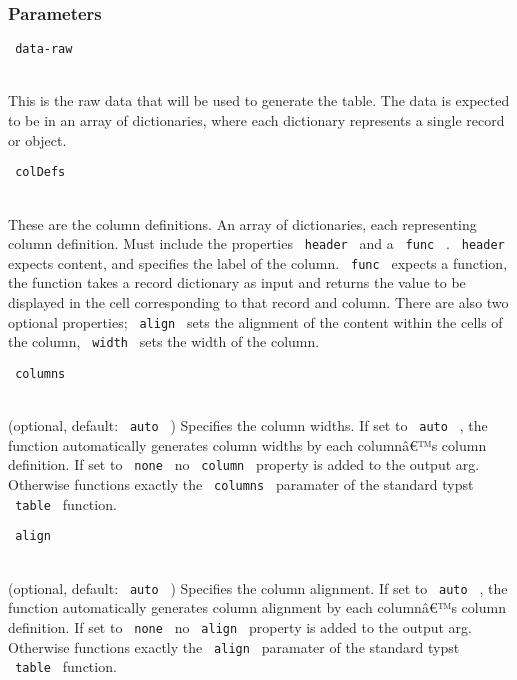 \begin{Shaded}
\begin{Highlighting}[]
\end{Highlighting}
\end{Shaded}

\subsubsection{Parameters}\label{parameters-1}

\texttt{\ data-raw\ }\strut \\
This is the raw data that will be used to generate the table. The data
is expected to be in an array of dictionaries, where each dictionary
represents a single record or object.

\texttt{\ colDefs\ }\strut \\
These are the column definitions. An array of dictionaries, each
representing column definition. Must include the properties
\texttt{\ header\ } and a \texttt{\ func\ } . \texttt{\ header\ }
expects content, and specifies the label of the column.
\texttt{\ func\ } expects a function, the function takes a record
dictionary as input and returns the value to be displayed in the cell
corresponding to that record and column. There are also two optional
properties; \texttt{\ align\ } sets the alignment of the content within
the cells of the column, \texttt{\ width\ } sets the width of the
column.

\texttt{\ columns\ }\strut \\
(optional, default: \texttt{\ auto\ } ) Specifies the column widths. If
set to \texttt{\ auto\ } , the function automatically generates column
widths by each columnâ€™s column definition. If set to \texttt{\ none\ }
no \texttt{\ column\ } property is added to the output arg. Otherwise
functions exactly the \texttt{\ columns\ } paramater of the standard
typst \texttt{\ table\ } function.

\texttt{\ align\ }\strut \\
(optional, default: \texttt{\ auto\ } ) Specifies the column alignment.
If set to \texttt{\ auto\ } , the function automatically generates
column alignment by each columnâ€™s column definition. If set to
\texttt{\ none\ } no \texttt{\ align\ } property is added to the output
arg. Otherwise functions exactly the \texttt{\ align\ } paramater of the
standard typst \texttt{\ table\ } function.

